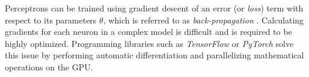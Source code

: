 Perceptrons can be trained using gradient descent of an error (or \textit{loss}) term with respect to its parameters $\theta$, which is referred to as \textit{back-propagation} \cite{back-propagation}. Calculating gradients for each neuron in a complex model is difficult and is required to be highly optimized. Programming libraries such as \textit{TensorFlow} \cite{tensorflow} or \textit{PyTorch} \cite{pytorch} solve this issue by performing automatic differentiation and parallelizing mathematical operations on the GPU.
